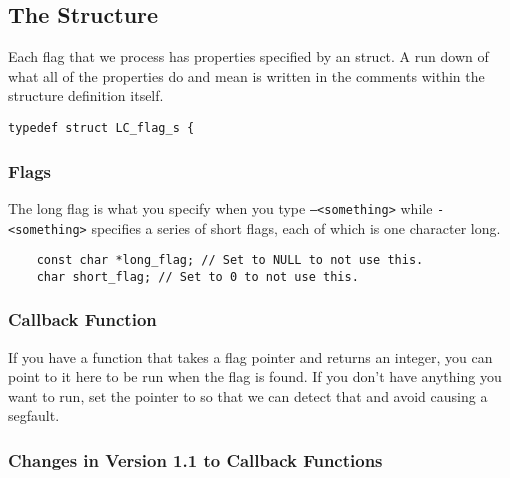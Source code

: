 \subsection{The  Structure}
\label{sec:LC_flag_t}

Each flag that we process has properties specified by an  struct. A run down of what all of the properties do and mean is written in the comments within the structure definition itself.

\begin{verbatim}
typedef struct LC_flag_s {
\end{verbatim}

\subsubsection{Flags}

The long flag is what you specify when you type \texttt{--<something>} while \texttt{-<something>} specifies a series of short flags, each of which is one character long.

\begin{verbatim}
	const char *long_flag; // Set to NULL to not use this.
	char short_flag; // Set to 0 to not use this.
\end{verbatim}

\subsubsection{Callback Function}
\label{sec:callback-function}

If you have a function that takes a flag pointer and returns an integer, you can point to it here to be run when the flag is found. If you don't have anything you want to run, set the pointer to  so that we can detect that and avoid causing a segfault.\footnotemark


\subsubsection*{Changes in Version 1.1 to Callback Functions}


